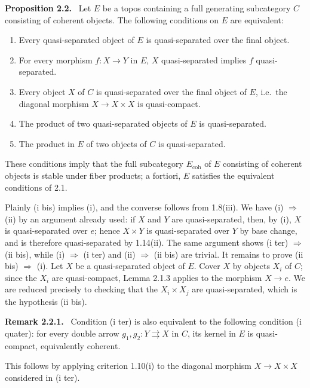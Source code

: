 \documentclass[11pt]{article}
\newcommand{\coh}{\mathrm{coh}}
\newcommand{\ie}{i.e.\ }
\newenvironment{statement}[1]{\par\medskip\noindent\textbf{#1.}\ }{\par\medskip}
\newenvironment{remarktext}[1]{\par\medskip\noindent\textbf{#1.}\ }{\par\medskip}
\begin{document}
\begin{statement}{Proposition 2.2}
Let \(E\) be a topos containing a full generating subcategory \(C\) consisting of coherent objects. The following conditions on \(E\) are equivalent:
\begin{enumerate}[label=(\roman*)]
\item Every quasi-separated object of \(E\) is quasi-separated over the final object.
\item[(i bis)] For every morphism \(f:X\to Y\) in \(E\), \(X\) quasi-separated implies \(f\) quasi-separated.
\item[(i ter)] Every object \(X\) of \(C\) is quasi-separated over the final object of \(E\), \ie the diagonal morphism \(X\to X\times X\) is quasi-compact.
\item The product of two quasi-separated objects of \(E\) is quasi-separated.
\item[(ii bis)] The product in \(E\) of two objects of \(C\) is quasi-separated.
\end{enumerate}
These conditions imply that the full subcategory \(E_{\coh}\) of \(E\) consisting of coherent objects is stable under fiber products; a fortiori, \(E\) satisfies the equivalent conditions of 2.1.
\end{statement}

Plainly (i bis) implies (i), and the converse follows from 1.8(iii). We have (i) \(\Rightarrow\) (ii) by an argument already used: if \(X\) and \(Y\) are quasi-separated, then, by (i), \(X\) is quasi-separated over \(e\); hence \(X\times Y\) is quasi-separated over \(Y\) by base change, and is therefore quasi-separated by 1.14(ii). The same argument shows (i ter) \(\Rightarrow\) (ii bis), while (i) \(\Rightarrow\) (i ter) and (ii) \(\Rightarrow\) (ii bis) are trivial. It remains to prove (ii bis) \(\Rightarrow\) (i). Let \(X\) be a quasi-separated object of \(E\). Cover \(X\) by objects \(X_i\) of \(C\); since the \(X_i\) are quasi-compact, Lemma 2.1.3 applies to the morphism \(X\to e\). We are reduced precisely to checking that the \(X_i\times X_j\) are quasi-separated, which is the hypothesis (ii bis).

\begin{remarktext}{Remark 2.2.1}
Condition (i ter) is also equivalent to the following condition (i quater): for every double arrow \(g_1,g_2:Y\rightrightarrows X\) in \(C\), its kernel in \(E\) is quasi-compact, equivalently coherent.
\end{remarktext}

This follows by applying criterion 1.10(i) to the diagonal morphism \(X\to X\times X\) considered in (i ter).
\end{document}
